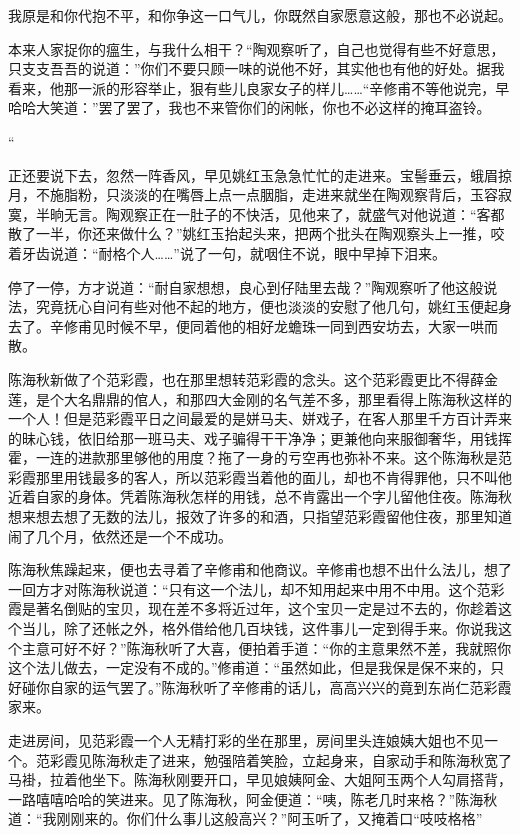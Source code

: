 \documentclass[12pt,UTF8]{ctexbook}
\begin{document}
{{{我原是和你代抱不平，和你争这一口气儿，你既然自家愿意这般，那也不必说起。

本来人家捉你的瘟生，与我什么相干？“陶观察听了，自己也觉得有些不好意思，只支支吾吾的说道：”你们不要只顾一味的说他不好，其实他也有他的好处。据我看来，他那一派的形容举止，狠有些儿良家女子的样儿……“辛修甫不等他说完，早哈哈大笑道：”罢了罢了，我也不来管你们的闲帐，你也不必这样的掩耳盗铃。

“

正还要说下去，忽然一阵香风，早见姚红玉急急忙忙的走进来。宝髻垂云，蛾眉掠月，不施脂粉，只淡淡的在嘴唇上点一点胭脂，走进来就坐在陶观察背后，玉容寂寞，半晌无言。陶观察正在一肚子的不快活，见他来了，就盛气对他说道：“客都散了一半，你还来做什么？”姚红玉抬起头来，把两个批头在陶观察头上一推，咬着牙齿说道：“耐格个人……”说了一句，就咽住不说，眼中早掉下泪来。

停了一停，方才说道：“耐自家想想，良心到仔陆里去哉？”陶观察听了他这般说法，究竟抚心自问有些对他不起的地方，便也淡淡的安慰了他几句，姚红玉便起身去了。辛修甫见时候不早，便同着他的相好龙蟾珠一同到西安坊去，大家一哄而散。

陈海秋新做了个范彩霞，也在那里想转范彩霞的念头。这个范彩霞更比不得薛金莲，是个大名鼎鼎的倌人，和那四大金刚的名气差不多，那里看得上陈海秋这样的一个人！但是范彩霞平日之间最爱的是姘马夫、姘戏子，在客人那里千方百计弄来的昧心钱，依旧给那一班马夫、戏子骗得干干净净；更兼他向来服御奢华，用钱挥霍，一连的进款那里够他的用度？拖了一身的亏空再也弥补不来。这个陈海秋是范彩霞那里用钱最多的客人，所以范彩霞当着他的面儿，却也不肯得罪他，只不叫他近着自家的身体。凭着陈海秋怎样的用钱，总不肯露出一个字儿留他住夜。陈海秋想来想去想了无数的法儿，报效了许多的和酒，只指望范彩霞留他住夜，那里知道闹了几个月，依然还是一个不成功。

陈海秋焦躁起来，便也去寻着了辛修甫和他商议。辛修甫也想不出什么法儿，想了一回方才对陈海秋说道：“只有这一个法儿，却不知用起来中用不中用。这个范彩霞是著名倒贴的宝贝，现在差不多将近过年，这个宝贝一定是过不去的，你趁着这个当儿，除了还帐之外，格外借给他几百块钱，这件事儿一定到得手来。你说我这个主意可好不好？”陈海秋听了大喜，便拍着手道：“你的主意果然不差，我就照你这个法儿做去，一定没有不成的。”修甫道：“虽然如此，但是我保是保不来的，只好碰你自家的运气罢了。”陈海秋听了辛修甫的话儿，高高兴兴的竟到东尚仁范彩霞家来。

走进房间，见范彩霞一个人无精打彩的坐在那里，房间里头连娘姨大姐也不见一个。范彩霞见陈海秋走了进来，勉强陪着笑脸，立起身来，自家动手和陈海秋宽了马褂，拉着他坐下。陈海秋刚要开口，早见娘姨阿金、大姐阿玉两个人勾肩搭背，一路嘻嘻哈哈的笑进来。见了陈海秋，阿金便道：“咦，陈老几时来格？”陈海秋道：“我刚刚来的。你们什么事儿这般高兴？”阿玉听了，又掩着口“吱吱格格”

}}}
\end{document}
